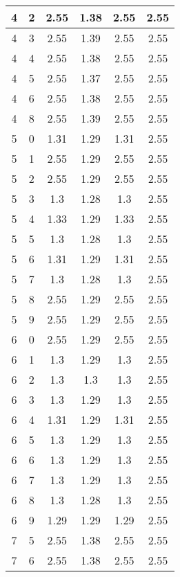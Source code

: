 \begin{longtable}{|c|c||c||c||c|c|}
	4 & 2 & 2.55 & 1.38 & 2.55 & 2.55 \\ \hline
	4 & 3 & 2.55 & 1.39 & 2.55 & 2.55 \\ \hline
	4 & 4 & 2.55 & 1.38 & 2.55 & 2.55 \\ \hline
	4 & 5 & 2.55 & 1.37 & 2.55 & 2.55 \\ \hline
	4 & 6 & 2.55 & 1.38 & 2.55 & 2.55 \\ \hline
	4 & 8 & 2.55 & 1.39 & 2.55 & 2.55 \\ \hline
	5 & 0 & 1.31 & 1.29 & 1.31 & 2.55 \\ \hline
	5 & 1 & 2.55 & 1.29 & 2.55 & 2.55 \\ \hline
	5 & 2 & 2.55 & 1.29 & 2.55 & 2.55 \\ \hline
	5 & 3 & 1.3 & 1.28 & 1.3 & 2.55 \\ \hline
	5 & 4 & 1.33 & 1.29 & 1.33 & 2.55 \\ \hline
	5 & 5 & 1.3 & 1.28 & 1.3 & 2.55 \\ \hline
	5 & 6 & 1.31 & 1.29 & 1.31 & 2.55 \\ \hline
	5 & 7 & 1.3 & 1.28 & 1.3 & 2.55 \\ \hline
	5 & 8 & 2.55 & 1.29 & 2.55 & 2.55 \\ \hline
	5 & 9 & 2.55 & 1.29 & 2.55 & 2.55 \\ \hline
	6 & 0 & 2.55 & 1.29 & 2.55 & 2.55 \\ \hline
	6 & 1 & 1.3 & 1.29 & 1.3 & 2.55 \\ \hline
	6 & 2 & 1.3 & 1.3 & 1.3 & 2.55 \\ \hline
	6 & 3 & 1.3 & 1.29 & 1.3 & 2.55 \\ \hline
	6 & 4 & 1.31 & 1.29 & 1.31 & 2.55 \\ \hline
	6 & 5 & 1.3 & 1.29 & 1.3 & 2.55 \\ \hline
	6 & 6 & 1.3 & 1.29 & 1.3 & 2.55 \\ \hline
	6 & 7 & 1.3 & 1.29 & 1.3 & 2.55 \\ \hline
	6 & 8 & 1.3 & 1.28 & 1.3 & 2.55 \\ \hline
	6 & 9 & 1.29 & 1.29 & 1.29 & 2.55 \\ \hline
	7 & 5 & 2.55 & 1.38 & 2.55 & 2.55 \\ \hline
	7 & 6 & 2.55 & 1.38 & 2.55 & 2.55 \\ \hline
\end{longtable}
\clearpage{}
